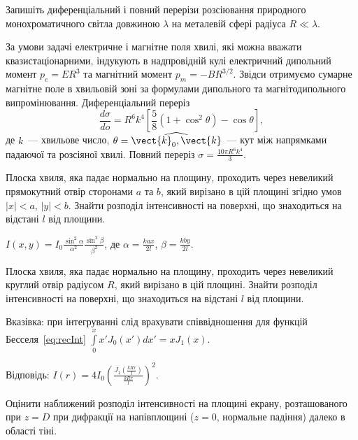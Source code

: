 \begin{problem}
Запишіть диференціальний і повний перерізи розсіювання природного монохроматичного світла довжиною
$\lambda$ на металевій сфері радіуса $R \ll \lambda$.
\begin{solution}
	За умови задачі  електричне і магнітне поля хвилі, які можна вважати квазистаціонарними, індукують
	в надпровідній кулі електричний дипольний момент $p_e=ER^3$ та магнітний момент $p_m=-BR^{3/2}$.
	Звідси отримуємо сумарне магнітне поле в хвильовій зоні за формулами дипольного та
	магнітодипольного випромінювання.
	Диференціальний переріз
	\[
		\frac{d\sigma}{do} = R^6 k^4 \left[\frac58 (1 + \cos^2\theta) -\cos\theta\right],
	\]
	де $k$~--- хвильове число, $\theta = \widehat{\vect{k}_0,\vect{k}}$~--- кут між напрямками
	падаючої та розсіяної хвилі.
	Повний переріз $\sigma = \frac{10\pi R^6 k^4}{3}$.
\end{solution}
\end{problem}

\begin{problem}
Плоска хвиля, яка падає нормально на площину, проходить через невеликий прямокутний отвір сторонами
$a$ та $b$, який вирізано в цій площині згідно умов $|x|< a$, $|y|<b$. Знайти розподіл інтенсивності
на поверхні, що знаходиться на відстані $l$ від площини.
\begin{solution}
	$I(x,y) = I_0\frac{\sin^2\alpha}{\alpha^2}\frac{\sin^2\beta}{\beta^2}$, де $\alpha =
	\frac{kax}{2l}$, $\beta=\frac{kby}{2l}$.
\end{solution}
\end{problem}

\begin{problem}
Плоска хвиля, яка падає нормально на площину, проходить через невеликий круглий отвір радіусом $R$,
який вирізано в цій площині. Знайти розподіл інтенсивності на поверхні, що знаходиться на відстані $l$
від площини.
\begin{solution}
	Вказівка: при інтегруванні слід врахувати співвідношення для функцій Бесселя~\eqref{eq:recInt}
	$\int\limits_0^x x'J_0(x')dx' = xJ_1(x)$.

	Відповідь: $I(r) = 4I_0\left( \frac{J_1\left( \frac{kRr}{l}\right) }{\frac{kRr}{l}}\right)^2$.
\end{solution}
\end{problem}

\begin{problem}
Оцінити наближений розподіл інтенсивності на площині екрану, розташованого при $z = D$   при дифракції
на напівплощині ($z = 0$, нормальне падіння) далеко в області тіні.
\end{problem}


